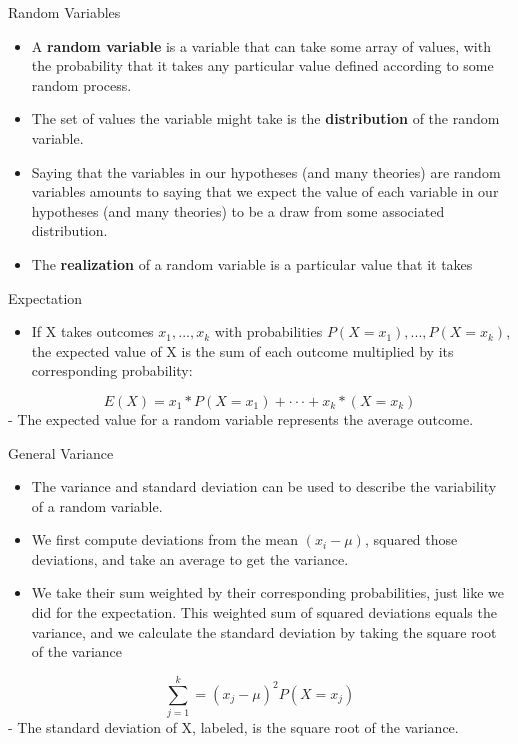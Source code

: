 \documentclass[
  ignorenonframetext,
]{beamer}
\providecommand{\tightlist}{%
  \setlength{\itemsep}{0pt}\setlength{\parskip}{0pt}}
\begin{document}
\begin{frame}{Random Variables}
\protect\hypertarget{random-variables}{}

\begin{itemize}
\item
  A \textbf{random variable} is a variable that can take some array of
  values, with the probability that it takes any particular value
  defined according to some random process.
\item
  The set of values the variable might take is the \textbf{distribution}
  of the random variable.
\item
  Saying that the variables in our hypotheses (and many theories) are
  random variables amounts to saying that we expect the value of each
  variable in our hypotheses (and many theories) to be a draw from some
  associated distribution.
\item
  The \textbf{realization} of a random variable is a particular value
  that it takes
\end{itemize}

\end{frame}

\begin{frame}{Expectation}
\protect\hypertarget{expectation}{}

\begin{itemize}
\tightlist
\item
  If X takes outcomes \(x_{1}, ..., x_{k}\) with probabilities
  \(P(X = x_{1}), ..., P(X = x_{k})\), the expected value of X is the
  sum of each outcome multiplied by its corresponding probability:
\end{itemize}

\[E(X) = x_{1}*P(X=x_{1})+···+x_{k}*(X=x_{k})\] - The expected value for
a random variable represents the average outcome.

\end{frame}

\begin{frame}{General Variance}
\protect\hypertarget{general-variance}{}

\begin{itemize}
\item
  The variance and standard deviation can be used to describe the
  variability of a random variable.
\item
  We first compute deviations from the mean \((x_i - \mu)\), squared
  those deviations, and take an average to get the variance.
\item
  We take their sum weighted by their corresponding probabilities, just
  like we did for the expectation. This weighted sum of squared
  deviations equals the variance, and we calculate the standard
  deviation by taking the square root of the variance
\end{itemize}

\[\sum_{j = 1}^{k} = (x_{j}-\mu)^{2}P(X=x_{j})  \] - The standard
deviation of X, labeled, is the square root of the variance.

\end{frame}
\end{document}
